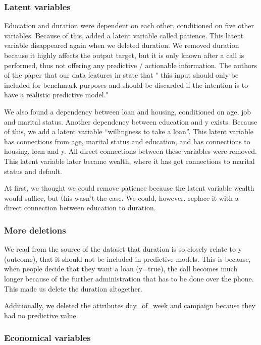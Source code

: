 \documentclass[11pt,]{article}
\begin{document}
\begin{multicols}{2}
\hypertarget{latent-variables}{%
\subsubsection{Latent variables}\label{latent-variables}}

Education and duration were dependent on each other, conditioned on five
other variables. Because of this, added a latent variable called
patience. This latent variable disappeared again when we deleted
duration. We removed duration because it highly affects the output
target, but it is only known after a call is performed, thus not
offering any predictive / actionable information. The authors of the
paper that our data features in state that " this input should only be
included for benchmark purposes and should be discarded if the intention
is to have a realistic predictive model."

We also found a dependency between loan and housing, conditioned on age,
job and marital status. Another dependency between education and y
exists. Because of this, we add a latent variable ``willingness to take
a loan''. This latent variable has connections from age, marital status
and education, and has connections to housing, loan and y. All direct
connections between these variables were removed. This latent variable
later became wealth, where it has got connections to marital status and
default.

At first, we thought we could remove patience because the latent
variable wealth would suffice, but this wasn't the case. We could,
however, replace it with a direct connection between education to
duration.

\hypertarget{more-deletions}{%
\subsubsection{More deletions}\label{more-deletions}}

We read from the source of the dataset that duration is so closely
relate to y (outcome), that it should not be included in predictive
models. This is because, when people decide that they want a loan
(y=true), the call becomes much longer because of the further
administration that has to be done over the phone. This made us delete
the duration altogether.

Additionally, we deleted the attributes day\_of\_week and campaign
because they had no predictive value.

\hypertarget{economical-variables}{%
\subsubsection{Economical variables}\label{economical-variables}}


\end{multicols}
\end{document}
